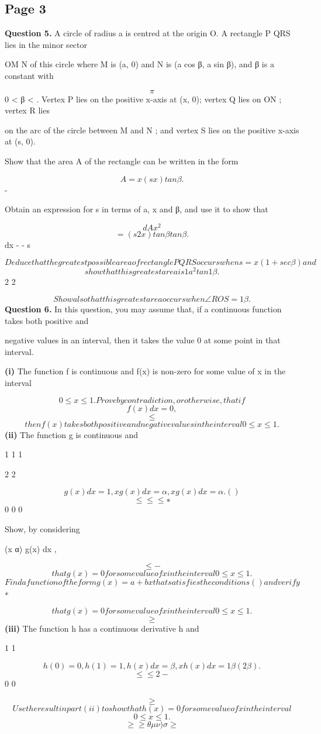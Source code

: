 \documentclass[12pt]{article}
\begin{document}
\subsection*{Page 3}
\begin{flushleft}
\bigskip\textbf{Question 5.} A circle of radius a is centred at the origin O. A rectangle P QRS lies in the minor sector\par
OM N of this circle where M is (a, 0) and N is (a cos β, a sin β), and β is a constant with\par
\[\pi\]
0 < β < . Vertex P lies on the positive x-axis at (x, 0); vertex Q lies on ON ; vertex R lies\par
on the arc of the circle between M and N ; and vertex S lies on the positive x-axis at (s, 0).\par
Show that the area A of the rectangle can be written in the form\par
\[A = x(s x) tan β .\]
-\par
Obtain an expression for s in terms of a, x and β, and use it to show that\par
\[dA x^2\]
\[= (s 2x) tan β tan β .\]
dx - - s\par
\[Deduce that the greatest possible area of rectangle P QRS occurs when s = x(1 + sec β) and\]
\[show that this greatest area is 1 a^2 tan 1 β .\]
2 2\par
\[Show also that this greatest area occurs when ∠ROS = 1 β .\]
\bigskip\textbf{Question 6.} In this question, you may assume that, if a continuous function takes both positive and\par
negative values in an interval, then it takes the value 0 at some point in that interval.\par
\textbf{(i)} The function f is continuous and f(x) is non-zero for some value of x in the interval\par
\[0 \leq x \leq 1. Prove by contradiction, or otherwise, that if\]
\[f(x)dx = 0 ,\]
\[\leq\]
\[then f(x) takes both positive and negative values in the interval 0 \leq x \leq 1.\]
\textbf{(ii)} The function g is continuous and\par
1 1 1\par
2 2\par
\[g(x) dx = 1 , xg(x) dx = α , x g(x) dx = α . ( )\]
\[\leq \leq \leq ∗\]
0 0 0\par
Show, by considering\par
(x α) g(x) dx ,\par
\[\leq -\]
\[that g(x) = 0 for some value of x in the interval 0 \leq x \leq 1.\]
\[Find a function of the form g(x) = a + bx that satisfies the conditions ( ) and verify\]
∗\par
\[that g(x) = 0 for some value of x in the interval 0 \leq x \leq 1.\]
\[\geq\]
\textbf{(iii)} The function h has a continuous derivative h and\par
1 1\par
\[h(0) = 0 , h(1) = 1 , h(x) dx = β , xh(x) dx = 1 β(2 β) .\]
\[\leq \leq 2 -\]
0 0\par
\[\geq\]
\[Use the result in part (ii) to show that h (x) = 0 for some value of x in the interval\]
\[0 \leq x \leq 1.\]
\[\geq\geq\theta\mu\nu) \sigma \geq\]
\end{flushleft}
\end{document}
